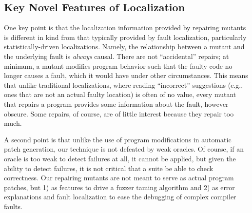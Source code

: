 \subsection{Key Novel Features of Localization}

One key point is that the localization information provided by
repairing mutants is different in kind from that typically provided by
fault localization, particularly statistically-driven localizations.
Namely, the relationship between a mutant and the underlying fault is
\emph{always} causal.  There are not ``accidental'' repairs; at
minimum, a mutant modifies program behavior such that the faulty code
no longer causes a fault, which it would have under other
circumstances.  This means that unlike traditional localizations,
where reading ``incorrect'' suggestions (e.g., ones that are not an
actual faulty location) is often of no value, every mutant that
repairs a program provides some information about the fault, however
obscure.  Some repairs, of course, are of little interest because they repair too much.

A second point is that unlike the use of program modifications in
automatic patch generation, our technique is not defeated by weak
oracles.  Of course, if an oracle is too weak to detect failures at
all, it cannot be applied, but given the ability to detect failures,
it is not critical that a suite be able to check correctness.  Our
repairing mutants are not meant to serve as actual program patches,
but 1) as features to drive a fuzzer taming algorithm and 2) as error
explanations and fault localization to ease the debugging of complex
compiler faults.
